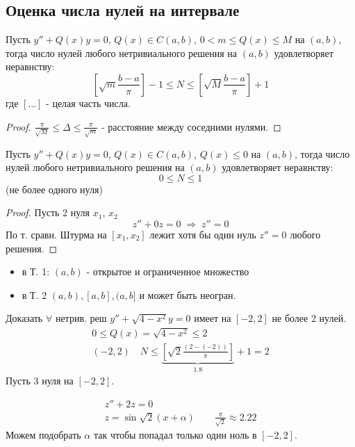 \documentclass{article}
\begin{document}

\subsection{Оценка числа нулей на интервале}
\begin{theorem}
  Пусть $y''+Q(x)y=0$, $Q(x)\in C(a,b)$, $0<m\le Q(x)\le M$ на $(a,b)$,
  тогда число нулей любого нетривиального решения на $(a,b)$
  удовлетворяет неравнству:
  \[
    \left[\sqrt{m}\frac{b-a}{\pi}\right]-1 \le N \le \left[\sqrt{M}\frac{b-a}{\pi}\right]+1
  \]
  где $[\dots ]$ - целая часть числа.
\end{theorem}
\begin{proof}
  $\frac{\pi}{\sqrt{M}}\le \Delta \le \frac{\pi}{\sqrt{m}}$
  - расстояние между соседними нулями.

\end{proof}
\begin{theorem}
  Пусть $y''+Q(x)y=0$, $Q(x)\in C(a,b)$, $Q(x) \le 0$ на $(a,b)$,
  тогда число нулей любого нетривиального решения на $(a,b)$
  удовлетворяет неравнству:
  \[
    0 \le N \le 1
  \]
  (не более одного нуля)
\end{theorem}
\begin{proof}
  Пусть 2 нуля $x_1$, $x_2$
  \[
    z''+0z=0 \;\Rightarrow\; z''=0
  \]
  По т. сравн. Штурма на $[x_1,x_2]$ лежит хотя бы один нуль
  $z''=0$ любого решения.
\end{proof}
\begin{remark}
  \begin{itemize}
    \item в Т. 1: $(a,b)$ - открытое и ограниченное множество
    \item в Т. 2 $(a,b), [a,b], (a,b]$ и может быть неогран.
  \end{itemize}
\end{remark}
\begin{eg}
  Доказать $\forall$ нетрив. реш $y''+\sqrt{4-x^{2}}y=0$
  имеет на $[-2,2]$ не более 2 нулей.
  \begin{gather*}
    0 \le Q(x)=\sqrt{4-x^{2}}\le 2  \\ 
    (-2,2) \quad N \le \underbrace{\left[\sqrt{2}\frac{(2-(-2))}{\pi}\right]}_{1.8}+1=2
  \end{gather*}
  Пусть 3 нуля на $[-2,2]$.

  \begin{gather*}
    z''+2z=0 \\ 
    z=\sin \sqrt{2}(x+\alpha) \qquad \frac{\pi}{\sqrt{2}}\approx 2.22
  \end{gather*}
  Можем подобрать $\alpha$ так чтобы попадал только один ноль в $[-2,2]$.
\end{eg}
\end{document}
